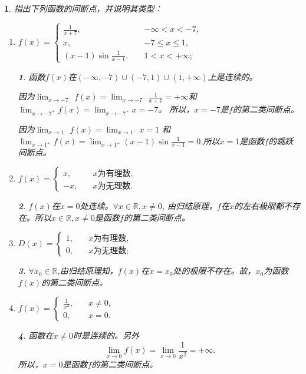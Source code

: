 \documentclass[utf8]{book}
\newtheorem{example}{}[section]             %
\newtheorem{solution}{}
\begin{document}
\begin{example}
指出下列函数的间断点，并说明其类型：
\renewcommand\labelenumi{\normalfont(\theenumi)}
\begin{enumerate}
\item $f(x)=
\begin{cases}
\frac{1}{x+7},\quad&-\infty < x< -7,\\
x, \quad & -7 \leq x\leq 1,\\
(x-1)\sin{\frac{1}{x-1}}, \quad&1< x <+\infty;
\end{cases}
$
\begin{solution}
函数$f(x)$在$(-\infty, -7)\cup (-7,1)\cup (1,+\infty)$上是连续的。

因为$\displaystyle\lim_{x\to -7^-}f(x)=\displaystyle\lim_{x\to -7^-}\frac{1}{x+7} = +\infty$和 $\displaystyle\lim_{x\to -7^+}f(x)=\displaystyle\lim_{x\to -7^+}x=-7$。
所以，$x=-7$是$f$的第二类间断点。

因为$\displaystyle\lim_{x\to 1^-}f(x)=\displaystyle\lim_{x\to 1^-}x=1$
和$\displaystyle\lim_{x\to 1^+}f(x)=\displaystyle\lim_{x\to 1^+}(x-1)\sin{\frac{1}{x-1}} = 0$.所以$x=1$是函数$f$的跳跃间断点。
\end{solution}
\item $f(x)=
\begin{cases}
x, \quad &x\text{为有理数},\\
-x,\quad &x\text{为无理数}.
\end{cases}
$
\begin{solution}$f(x)$在$x=0$处连续。$\forall x\in \mathbb{R}, x\neq 0$, 由归结原理，$f$在$x$的左右极限都不存在。所以$x\in \mathbb{R}, x\neq 0$是函数$f$的第二类间断点。
\end{solution}
\item $D(x)=
\begin{cases}
1,\quad&x\text{为有理数},\\
0,\quad&x\text{为无理数};
\end{cases}$
\begin{solution}$\forall x_0\in\mathbb{R}$,由归结原理知，$f(x)$在$x=x_0$处的极限不存在。故，$x_0$为函数$f(x)$的第二类间断点。
\end{solution}
\item $f(x)=
\begin{cases}
\frac{1}{x^2},\quad &x\neq 0,\\
0,\quad &x=0.
\end{cases}
$
\begin{solution}函数在$x\neq 0$时是连续的。另外
$$\displaystyle\lim_{x\to 0}f(x)=\displaystyle\lim_{x\to 0}\frac{1}{x^2}=+\infty.$$
所以，$x=0$是函数$f$的第二类间断点。
\end{solution}
\end{enumerate}
\end{example}
\end{document}
